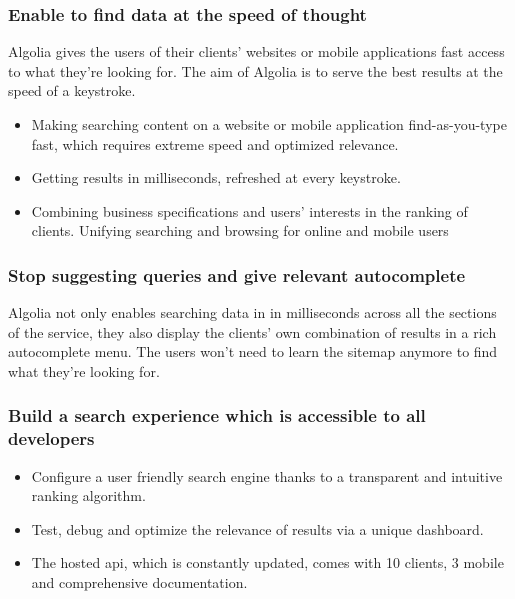 \subsubsection{Enable to find data at the speed of thought}

Algolia gives the users of their clients' websites or mobile applications fast access to what they’re looking for. The aim of Algolia is to serve the best results at the speed of a keystroke.

\begin{itemize}
  \item Making searching content on a website or mobile application find-as-you-type fast, which requires extreme speed and optimized relevance.
  \item Getting results in milliseconds, refreshed at every keystroke.
  \item Combining business specifications and users' interests in the ranking of clients.
  Unifying searching and browsing for online and mobile users
\end{itemize}

\subsubsection{Stop suggesting queries and give relevant autocomplete}

Algolia not only enables searching data in in milliseconds across all the sections of the service, they also display the clients' own combination of results in a rich autocomplete menu. The users won't need to learn the sitemap anymore to find what they're looking for.

\subsubsection{Build a search experience which is accessible to all developers}

\begin{itemize}
  \item Configure a user friendly search engine thanks to a transparent and intuitive ranking algorithm.
  \item Test, debug and optimize the relevance of results via a unique dashboard.
  \item The hosted \acrshort{api}, which is constantly updated, comes with 10 clients, 3 mobile  and comprehensive documentation.
\end{itemize}

